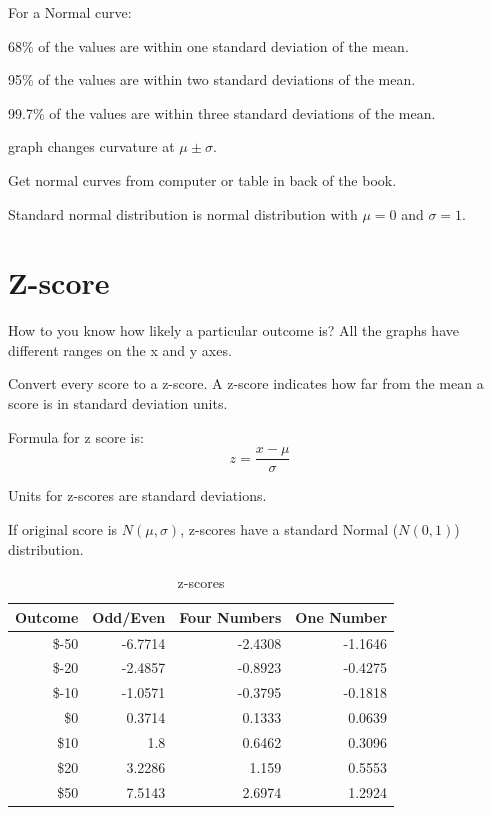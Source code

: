 \documentclass[landscape]{exam}
\begin{document}
  For a Normal curve:
  \begin{itemize*}
    \item 68\% of the values are within one standard deviation of the mean.

    \item 95\% of the values are within two standard deviations of the mean.

    \item 99.7\% of the values are within three standard deviations of the mean.

    \item graph changes curvature at $\mu \pm \sigma$.

  \end{itemize*}

  Get normal curves from computer or table in back of the book.

  Standard normal distribution is normal distribution with $\mu = 0$ and
  $\sigma = 1$.

  \section{Z-score}

  How to you know how likely a particular outcome is?  All the graphs have
  different ranges on the x and y axes.
  
  Convert every score to a z-score. A z-score indicates how far from the mean a
  score is in standard deviation units.

  Formula for z score is:
  \[
    z = \frac{x - \mu}{\sigma}
  \]

  Units for z-scores are standard deviations.

  If original score is $N(\mu, \sigma)$, z-scores have a standard Normal
  ($N(0, 1)$) distribution. 

  \begin{table}
    \centering
    \begin{tabular}[H]{rrrr}
      \toprule
      Outcome & Odd/Even & Four Numbers & One Number \\
      \midrule
      \$-50   & -6.7714  & -2.4308      & -1.1646 \\
      \$-20   & -2.4857  & -0.8923      & -0.4275 \\
      \$-10   & -1.0571  & -0.3795      & -0.1818 \\
      \$0     & 0.3714   & 0.1333       & 0.0639  \\
      \$10    & 1.8      & 0.6462       & 0.3096 \\
      \$20    & 3.2286   & 1.159        & 0.5553 \\
      \$50    & 7.5143   & 2.6974       & 1.2924 \\
      \bottomrule
    \end{tabular}
    \caption{z-scores}\label{tab:z-scores}
  \end{table}
\end{document}
